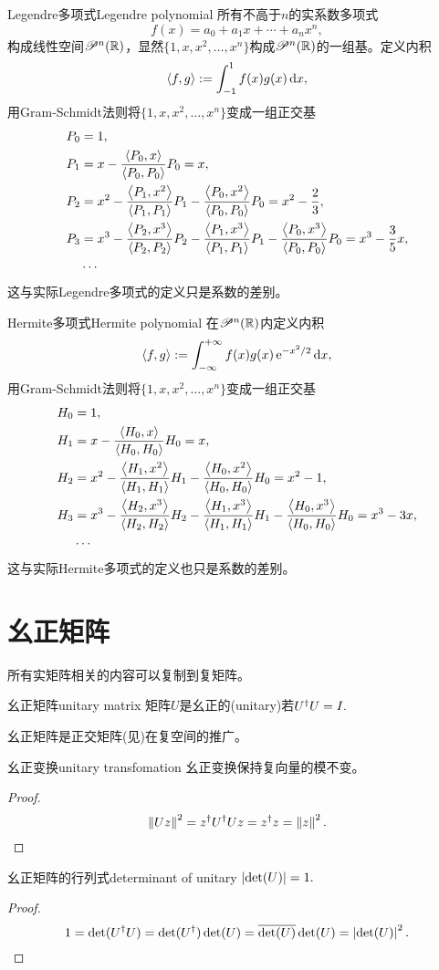 \begin{example}{Legendre多项式}{Legendre polynomial}
	所有不高于$n$的实系数多项式
	\[
		f(x)=a_0+a_1x+\cdots+a_nx^n,
	\]
	构成线性空间$\mathscr P^n(\mathbb R)$，显然$\{1,x,x^2,\ldots,x^n\}$构成$\mathscr P^n(\mathbb R)$的一组基。定义内积
	\[
		\left\langle f,g\right\rangle:=\int_{-1}^1f(x)g(x)\mathop{}\!\mathrm{d} x,
	\]
	用Gram-Schmidt法则将$\{1,x,x^2,\ldots,x^n\}$变成一组正交基%
	\begin{align*}
		P_0&=1,\\
		P_1&=x-\frac{\left\langle P_0,x\right\rangle}{\left\langle P_0,P_0\right\rangle}P_0=x,\\
		P_2&=x^2-\frac{\left\langle P_1,x^2\right\rangle}{\left\langle P_1,P_1\right\rangle}P_1-\frac{\left\langle P_0,x^2\right\rangle}{\left\langle P_0,P_0\right\rangle}P_0=x^2-\frac23,\\
		P_3&=x^3-\frac{\left\langle P_2,x^3\right\rangle}{\left\langle P_2,P_2\right\rangle}P_2-\frac{\left\langle P_1,x^3\right\rangle}{\left\langle P_1,P_1\right\rangle}P_1-\frac{\left\langle P_0,x^3\right\rangle}{\left\langle P_0,P_0\right\rangle}P_0=x^3-\frac35x,\\
		&\cdots
	\end{align*}
	这与实际Legendre多项式的定义只是系数的差别。
\end{example}
\begin{example}{Hermite多项式}{Hermite polynomial}
	在$\mathscr P^n(\mathbb R)$内定义内积
	\[
		\left\langle f,g\right\rangle:=\int_{-\infty}^{+\infty} f(x)g(x)\mathop{}\!\mathrm{e}^{-x^2/2}\mathop{}\!\mathrm{d} x,
	\]
	用Gram-Schmidt法则将$\{1,x,x^2,\ldots,x^n\}$变成一组正交基
	\begin{align*}
		H_0&=1,\\
		H_1&=x-\frac{\left\langle H_0,x\right\rangle}{\left\langle H_0,H_0\right\rangle}H_0=x,\\
		H_2&=x^2-\frac{\left\langle H_1,x^2\right\rangle}{\left\langle H_1,H_1\right\rangle}H_1-\frac{\left\langle H_0,x^2\right\rangle}{\left\langle H_0,H_0\right\rangle}H_0=x^2-1,\\
		H_3&=x^3-\frac{\left\langle H_2,x^3\right\rangle}{\left\langle H_2,H_2\right\rangle}H_2-\frac{\left\langle H_1,x^3\right\rangle}{\left\langle H_1,H_1\right\rangle}H_1-\frac{\left\langle H_0,x^3\right\rangle}{\left\langle H_0,H_0\right\rangle}H_0=x^3-3x,\\
		&\cdots
	\end{align*}
	这与实际Hermite多项式的定义也只是系数的差别。
\end{example}

\section{幺正矩阵}

所有实矩阵相关的内容可以复制到复矩阵。

\begin{definition}{幺正矩阵}{unitary matrix}
	矩阵$U$是幺正的(unitary)若$U^\dagger U=I.$
\end{definition}
幺正矩阵是正交矩阵(见)在复空间的推广。
\begin{theorem}{幺正变换}{unitary transfomation}
	幺正变换保持复向量的模不变。
\end{theorem}
\begin{proof}
	\[
		\left\lVert Uz\right\rVert^2=z^\dagger U^\dagger Uz=z^\dagger z=\left\lVert z\right\rVert^2.
		\qedhere
	\]
\end{proof}
\begin{theorem}{幺正矩阵的行列式}{determinant of unitary}
	$\left\lvert\det(U)\right\rvert=1.$
\end{theorem}
\begin{proof}
	\[
		1=\det(U^\dagger U)=\det(U^\dagger)\det(U)=\overline{\det(U)}\det(U)=\left\lvert\det(U)\right\rvert^2.
		\qedhere
	\]
\end{proof}

